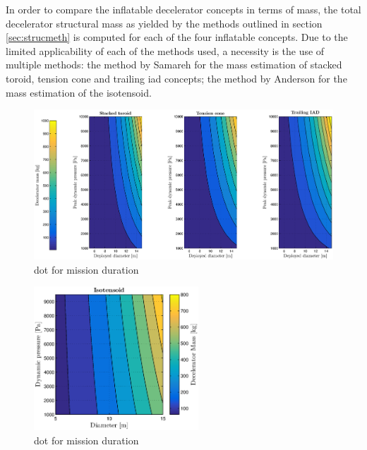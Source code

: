 In order to compare the inflatable decelerator concepts in terms of mass, the total decelerator structural mass as yielded by the methods outlined in section \ref{sec:strucmeth} is computed for each of the four inflatable concepts. Due to the limited applicability of each of the methods used, a necessity is the use of multiple methods: the method by Samareh \cite{Samareh2011} for the mass estimation of stacked toroid, tension cone and trailing \gls{iad} concepts; the method by Anderson \cite{Anderson1969} for the mass estimation of the isotensoid.

\begin{figure}[H]
\hspace{-14mm}
\includegraphics[width = 1.2\textwidth]{Figure/mass_dia_qmax.eps}
\caption{\acrlong{dot} for mission duration}
\label{fig:mass_dia_qmax}
\end{figure}

\begin{figure}[H]
\centering
\includegraphics[width = 0.55\textwidth]{Figure/ISO_comp.eps}
\caption{\acrlong{dot} for mission duration}
\label{fig:ISO_comp}
\end{figure}


